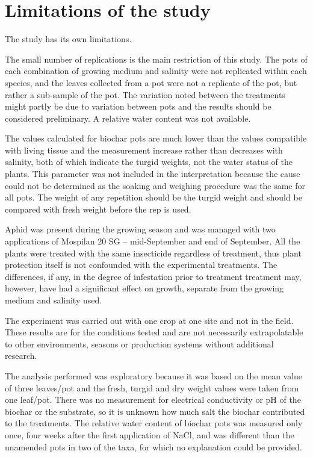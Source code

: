 \section{Limitations of the study}

The study has its own limitations.

The small number of replications is the main restriction of this study. The pots of each combination of growing medium and salinity were not replicated within each species, and the leaves collected from a pot were not a replicate of the pot, but rather a sub-sample of the pot. The variation noted between the treatments might partly be due to variation between pots and the results should be considered preliminary. A relative water content was not available.

The values calculated for biochar pots are much lower than the values compatible with living tissue and the measurement increase rather than decreases with salinity, both of which indicate the turgid weights, not the water status of the plants. This parameter was not included in the interpretation because the cause could not be determined as the soaking and weighing procedure was the same for all pots. The weight of any repetition should be the turgid weight and should be compared with fresh weight before the rep is used.

Aphid was present during the growing season and was managed with two applications of Mospilan 20 SG – mid-September and end of September. All the plants were treated with the same insecticide regardless of treatment, thus plant protection itself is not confounded with the experimental treatments. The differences, if any, in the degree of infestation prior to treatment treatment may, however, have had a significant effect on growth, separate from the growing medium and salinity used.

The experiment was carried out with one crop at one site and not in the field. These results are for the conditions tested and are not necessarily extrapolatable to other environments, seasons or production systems without additional research.

The analysis performed was exploratory because it was based on the mean value of three leaves/pot and the fresh, turgid and dry weight values were taken from one leaf/pot. There was no measurement for electrical conductivity or pH of the biochar or the substrate, so it is unknown how much salt the biochar contributed to the treatments. The relative water content of biochar pots was measured only once, four weeks after the first application of NaCl, and was different than the unamended pots in two of the taxa, for which no explanation could be provided.

